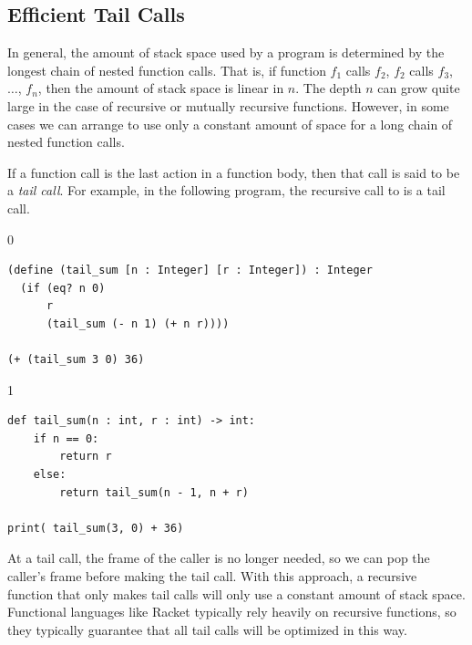 \documentclass[7x10]{TimesAPriori_MIT}%
\def\racketEd{0}
\def\pythonEd{1}
\def\edition{1}
\begin{document}

\subsection{Efficient Tail Calls}
\label{sec:tail-call}

In general, the amount of stack space used by a program is determined
by the longest chain of nested function calls. That is, if function
$f_1$ calls $f_2$, $f_2$ calls $f_3$, $\ldots$, $f_n$, then the amount
of stack space is linear in $n$.  The depth $n$ can grow quite large
in the case of recursive or mutually recursive functions. However, in
some cases we can arrange to use only a constant amount of space for a
long chain of nested function calls.

If a function call is the last action in a function body, then that
call is said to be a \emph{tail call}.
For example, in the following
program, the recursive call to  is a tail call.
\begin{center}
{\if\edition\racketEd  
\begin{lstlisting}
(define (tail_sum [n : Integer] [r : Integer]) : Integer
  (if (eq? n 0) 
      r
      (tail_sum (- n 1) (+ n r))))

(+ (tail_sum 3 0) 36)
\end{lstlisting}
\fi}
{\if\edition\pythonEd
\begin{lstlisting}
def tail_sum(n : int, r : int) -> int:
    if n == 0:
        return r
    else:
        return tail_sum(n - 1, n + r)

print( tail_sum(3, 0) + 36)
\end{lstlisting}
\fi}
\end{center}
At a tail call, the frame of the caller is no longer needed, so we can
pop the caller's frame before making the tail call. With this
approach, a recursive function that only makes tail calls will only
use a constant amount of stack space.  Functional languages like
Racket typically rely heavily on recursive functions, so they
typically guarantee that all tail calls will be optimized in this way.
\end{document}
